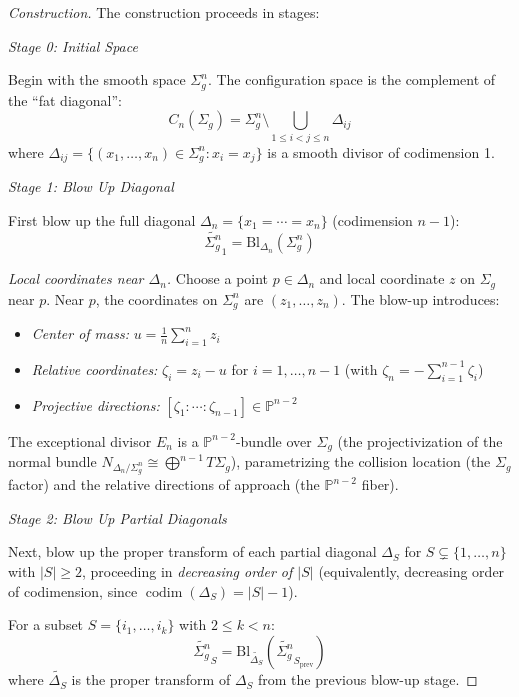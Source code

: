 \begin{proof}[Construction]
The construction proceeds in stages:

\medskip
\noindent\emph{Stage 0: Initial Space}

Begin with the smooth space $\Sigma_g^n$. The configuration space is the complement of the ``fat diagonal'':
\[C_n(\Sigma_g) = \Sigma_g^n \setminus \bigcup_{1 \leq i < j \leq n} \Delta_{ij}\]
where $\Delta_{ij} = \{(x_1,\ldots,x_n) \in \Sigma_g^n : x_i = x_j\}$ is a smooth divisor of codimension 1.

\medskip
\noindent\emph{Stage 1: Blow Up Diagonal}

First blow up the full diagonal $\Delta_n = \{x_1 = \cdots = x_n\}$ (codimension $n-1$):
\[\widetilde{\Sigma_g^n}_1 = \text{Bl}_{\Delta_n}(\Sigma_g^n)\]

\emph{Local coordinates near $\Delta_n$.} Choose a point $p \in \Delta_n$ and local coordinate $z$ on $\Sigma_g$ near $p$. Near $p$, the coordinates on $\Sigma_g^n$ are $(z_1,\ldots,z_n)$. The blow-up introduces:
\begin{itemize}
\item \emph{Center of mass:} $u = \frac{1}{n}\sum_{i=1}^n z_i$
\item \emph{Relative coordinates:} $\zeta_i = z_i - u$ for $i = 1,\ldots,n-1$ (with $\zeta_n = -\sum_{i=1}^{n-1}\zeta_i$)
\item \emph{Projective directions:} $[\zeta_1 : \cdots : \zeta_{n-1}] \in \mathbb{P}^{n-2}$
\end{itemize}

The exceptional divisor $E_n$ is a $\mathbb{P}^{n-2}$-bundle over $\Sigma_g$ (the projectivization of the normal bundle $N_{\Delta_n/\Sigma_g^n} \cong \bigoplus^{n-1} T\Sigma_g$), parametrizing the collision location (the $\Sigma_g$ factor) and the relative directions of approach (the $\mathbb{P}^{n-2}$ fiber).

\medskip
\noindent\emph{Stage 2: Blow Up Partial Diagonals}

Next, blow up the proper transform of each partial diagonal $\Delta_S$ for $S \subsetneq \{1,\ldots,n\}$ with $|S| \geq 2$, proceeding in \emph{decreasing order of $|S|$} (equivalently, decreasing order of codimension, since $\operatorname{codim}(\Delta_S) = |S|-1$).

For a subset $S = \{i_1, \ldots, i_k\}$ with $2 \leq k < n$:
\[\widetilde{\Sigma_g^n}_{S} = \text{Bl}_{\widetilde{\Delta_S}}(\widetilde{\Sigma_g^n}_{S_{\text{prev}}})\]
where $\widetilde{\Delta_S}$ is the proper transform of $\Delta_S$ from the previous blow-up stage.


\end{proof}
